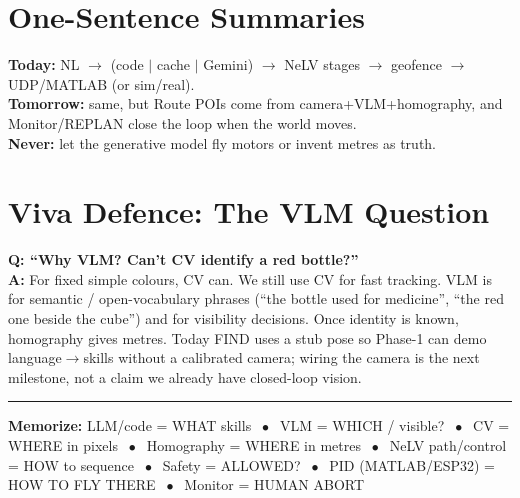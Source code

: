 \documentclass[11pt,a4paper]{article}
\begin{document}
\section{One-Sentence Summaries}

\begin{keyidea}[title={\textbf{Memorize}}]
\textbf{Today:} NL $\to$ (code $|$ cache $|$ Gemini) $\to$ NeLV stages $\to$ geofence $\to$
UDP/MATLAB (or sim/real).\\
\textbf{Tomorrow:} same, but Route POIs come from camera+VLM+homography, and Monitor/REPLAN
close the loop when the world moves.\\
\textbf{Never:} let the generative model fly motors or invent metres as truth.
\end{keyidea}

\section{Viva Defence: The VLM Question}

\begin{quotebox}
\textbf{Q: ``Why VLM? Can't CV identify a red bottle?''}\\[4pt]
\textbf{A:} For fixed simple colours, CV can. We still use CV for fast tracking. VLM is for
semantic / open-vocabulary phrases (``the bottle used for medicine'', ``the red one beside the
cube'') and for visibility decisions. Once identity is known, homography gives metres.
Today FIND uses a stub pose so Phase-1 can demo language$\to$skills without a calibrated camera;
wiring the camera is the next milestone, not a claim we already have closed-loop vision.
\end{quotebox}

\begin{center}
\rule{0.4\linewidth}{0.4pt}
\end{center}
\begin{center}
\small\color{steel!70!black}
\textbf{Memorize:} LLM/code = WHAT skills $\;\bullet\;$
VLM = WHICH / visible? $\;\bullet\;$
CV = WHERE in pixels $\;\bullet\;$
Homography = WHERE in metres $\;\bullet\;$
NeLV path/control = HOW to sequence $\;\bullet\;$
Safety = ALLOWED? $\;\bullet\;$
PID (MATLAB/ESP32) = HOW TO FLY THERE $\;\bullet\;$
Monitor = HUMAN ABORT
\end{center}
\end{document}
